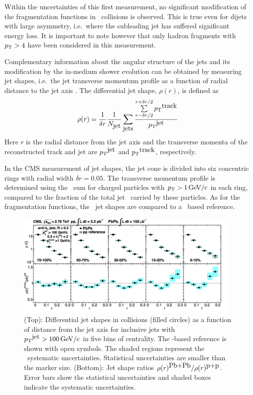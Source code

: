 Within the uncertainties of this first measurement, no significant modification of 
the fragmentation functions in \PbPb\ collisions is observed. This is true even for 
dijets with large asymmetry, i.e.\ where the subleading jet has suffered significant
energy loss. It is important to note however that only hadron fragments with $\mbox{$p_{\mathrm{T}}$} > 4$\GeVc
have been considered in this measurement.

Complementary information about the angular structure of the jets and its modification
by the in-medium shower evolution can be obtained by measuring jet shapes, i.e.\ the 
jet transverse momentum profile as a function of radial distance to the jet axis
\cite{MehtarTani:2010ma,Idilbi:2008vm,CasalderreySolana:2011rz,CasalderreySolana:2011rq,Neufeld:2011yh,Blaizot:2012fh,Fickinger:2013xwa}. 
The differential jet shape, $\rho(r)$, is defined as
\begin{equation}
\rho(r) = \frac{1}{\delta r} \frac{1}{N_{\mbox{jet}}} \sum_{\mbox{jets}}
\frac{\sum\limits_{{r - \delta r/2}}^{{r + \delta r/2}}{\mbox{$p_{\mathrm{T}}$}^{\mbox{track}}}}{\mbox{$p_{\mathrm{T}}$}^{\mbox{jet}}}
\label{eq:rho(r)}
\end{equation}
Here $r$ is the radial distance from the jet axis
and the transverse momenta of the reconstructed track and jet are 
$\mbox{$p_{\mathrm{T}}$}^{\mbox{jet}}$ and $\mbox{$p_{\mathrm{T}}$}^{\mbox{track}}$, respectively.

In the CMS measurement of jet shapes, the jet cone is divided into six concentric rings 
with radial width $\delta r = 0.05$. The transverse momentum profile is determined using
the \pT\ sum for charged particles with $\mbox{$p_{\mathrm{T}}$} > 1\,\mathrm{GeV/c}$ in each ring, compared to 
the fraction of the total jet \pT\ carried by these particles. As for the fragmentation
functions, the \PbPb\ jet shapes are compared to a \pp\ based reference.

\begin{figure}[!h]
\begin{center}
\includegraphics[width=0.98\textwidth]{jetfigures/JetShapes_GR.png}
\caption{\label{fig:JSRatio}
(Top): Differential jet shapes in \PbPb collisions (filled circles)
as a function of distance from the jet axis for inclusive jets with $\mbox{$p_{\mathrm{T}}$}^{\mbox{jet}} >100\,\mathrm{GeV/c}$ 
in five bins of centrality.  The \pp-based reference is shown with open symbols.
The shaded regions represent the \PbPb\ systematic uncertainties. 
Statistical uncertainties are smaller than the marker size. 
(Bottom): Jet shape ratios $\rho(r)^{\mbox{Pb+Pb}}/\rho(r)^{\mbox{p+p}}$.
Error bars show the statistical uncertainties and shaded boxes indicate the systematic uncertainties. }
\label{fig:GR:CMS_jetshapes}
\end{center}
\end{figure}

